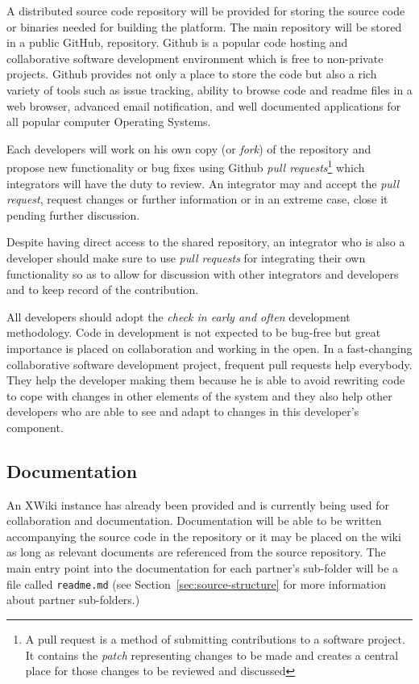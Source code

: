 A distributed source code repository will be provided for storing the source code or binaries
needed for building the \learnpad platform. The main repository will be stored in a public GitHub,
repository. Github is a popular code hosting and collaborative software development environment
which is free to non-private projects. Github provides not only a place to store the code but also
a rich variety of tools such as issue tracking, ability to browse code and readme files in a web
browser, advanced email notification, and well documented applications for all popular computer
Operating Systems.

Each developers will work on his own copy (or \emph{fork}) of the repository and propose new
functionality or bug fixes using Github \emph{pull requests}\footnote{A pull request is a method of
submitting contributions to a software project. It contains the \emph{patch} representing changes to
be made and creates a central place for those changes to be reviewed and discussed} which
integrators will have the duty to review. An integrator may and accept the \emph{pull request},
request changes or further information or in an extreme case, close it pending further discussion.

Despite having direct access to the shared repository, an integrator who is also a developer should
make sure to use \emph{pull requests} for integrating their own functionality so as to allow for
discussion with other integrators and developers and to keep record of the contribution.

All developers should adopt the \emph{check in early and often} development methodology.
Code in development is not expected to be bug-free but great importance is placed on collaboration
and working in the open. In a fast-changing collaborative software development project, frequent
pull requests help everybody. They help the developer making them because he is able to avoid
rewriting code to cope with changes in other elements of the system and they also help other
developers who are able to see and adapt to changes in this developer's component.

\subsection{Documentation}
\label{sec:documentation}

An XWiki instance has already been provided and is currently being used for collaboration and
documentation. Documentation will be able to be written accompanying the source code in the
repository or it may be placed on the wiki as long as relevant documents are referenced from the
source repository. The main entry point into the documentation for each partner's sub-folder will
be a file called \texttt{readme.md} (see Section~\ref{sec:source-structure} for more information
about partner sub-folders.)

